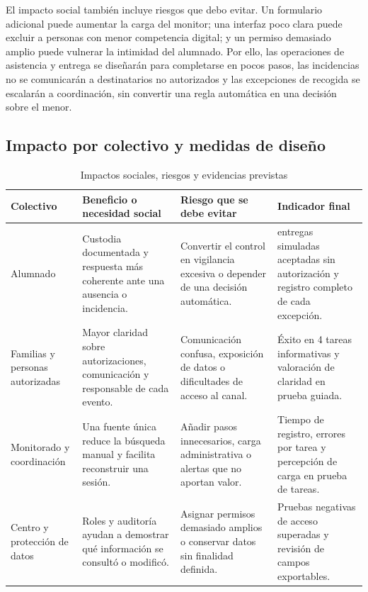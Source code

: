 El impacto social también incluye riesgos que debo evitar. Un formulario adicional puede aumentar la carga del monitor; una interfaz poco clara puede excluir a personas con menor competencia digital; y un permiso demasiado amplio puede vulnerar la intimidad del alumnado. Por ello, las operaciones de asistencia y entrega se diseñarán para completarse en pocos pasos, las incidencias no se comunicarán a destinatarios no autorizados y las excepciones de recogida se escalarán a coordinación, sin convertir una regla automática en una decisión sobre el menor.

\subsection{Impacto por colectivo y medidas de diseño}\label{sec:5-5-1}

\begin{table}[H]
\centering\small
\begin{tabularx}{\textwidth}{>{\hsize=0.747\hsize\raggedright\arraybackslash}X>{\hsize=1.095\hsize\raggedright\arraybackslash}X>{\hsize=1.095\hsize\raggedright\arraybackslash}X>{\hsize=1.063\hsize\raggedright\arraybackslash}X}
\toprule
\rowcolor{cabeceratabla} \textbf{Colectivo} & \textbf{Beneficio o necesidad social} & \textbf{Riesgo que se debe evitar} & \textbf{Indicador final} \\
\midrule
Alumnado & Custodia documentada y respuesta más coherente ante una ausencia o incidencia. & Convertir el control en vigilancia excesiva o depender de una decisión automática. & 0 entregas simuladas aceptadas sin autorización y registro completo de cada excepción. \\
Familias y personas autorizadas & Mayor claridad sobre autorizaciones, comunicación y responsable de cada evento. & Comunicación confusa, exposición de datos o dificultades de acceso al canal. & Éxito en 4 tareas informativas y valoración de claridad en prueba guiada. \\
Monitorado y coordinación & Una fuente única reduce la búsqueda manual y facilita reconstruir una sesión. & Añadir pasos innecesarios, carga administrativa o alertas que no aportan valor. & Tiempo de registro, errores por tarea y percepción de carga en prueba de tareas. \\
Centro y protección de datos & Roles y auditoría ayudan a demostrar qué información se consultó o modificó. & Asignar permisos demasiado amplios o conservar datos sin finalidad definida. & Pruebas negativas de acceso superadas y revisión de campos exportables. \\
\bottomrule
\end{tabularx}
\caption{Impactos sociales, riesgos y evidencias previstas}\label{tab:40}
\end{table}

